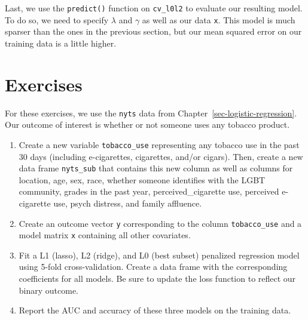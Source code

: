 \documentclass[
  letterpaper,
]{latex/krantz}
\makeatletter
\newenvironment{Shaded}{\begin{snugshade}}{\end{snugshade}}
\newcommand{\AttributeTok}[1]{\textcolor[rgb]{0.40,0.45,0.13}{#1}}
\newcommand{\CommentTok}[1]{\textcolor[rgb]{0.37,0.37,0.37}{#1}}
\newcommand{\DecValTok}[1]{\textcolor[rgb]{0.68,0.00,0.00}{#1}}
\newcommand{\FunctionTok}[1]{\textcolor[rgb]{0.28,0.35,0.67}{#1}}
\newcommand{\NormalTok}[1]{\textcolor[rgb]{0.00,0.23,0.31}{#1}}
\newcommand{\OtherTok}[1]{\textcolor[rgb]{0.00,0.23,0.31}{#1}}
\newcommand{\SpecialCharTok}[1]{\textcolor[rgb]{0.37,0.37,0.37}{#1}}
\newenvironment{kframe}{%
\medskip{}
\setlength{\fboxsep}{.8em}
 \def\at@end@of@kframe{}%
 \ifinner\ifhmode%
  \def\at@end@of@kframe{\end{minipage}}%
  \begin{minipage}{\columnwidth}%
 \fi\fi%
 \def\FrameCommand##1{\hskip\@totalleftmargin \hskip-\fboxsep
 \colorbox{shadecolor}{##1}\hskip-\fboxsep
     \hskip-\linewidth \hskip-\@totalleftmargin \hskip\columnwidth}%
 \MakeFramed {\advance\hsize-\width
   \@totalleftmargin\z@ \linewidth\hsize
   \@setminipage}}%
 {\par\unskip\endMakeFramed%
 \at@end@of@kframe}
\renewenvironment{Shaded}{\begin{kframe}}{\end{kframe}}
\makeatother
\begin{document}
Last, we use the
\texttt{predict()}
function on \texttt{cv\_l0l2} to evaluate our resulting model. To do so,
we need to specify \(\lambda\) and \(\gamma\) as well as our data
\texttt{x}. This model is much sparser than the ones in the previous
section, but our mean squared error on our training data is a little
higher.

\begin{Shaded}
\end{Shaded}

\section{Exercises}\label{exercises-10}

For these exercises, we use the \texttt{nyts} data from
Chapter~\ref{sec-logistic-regression}. Our outcome of interest is
whether or not someone uses any tobacco product.

\begin{enumerate}
\def\labelenumi{\arabic{enumi}.}
\item
  Create a new variable \texttt{tobacco\_use} representing any tobacco
  use in the past 30 days (including e-cigarettes, cigarettes, and/or
  cigars). Then, create a new data frame \texttt{nyts\_sub} that
  contains this new column as well as columns for location, age, sex,
  race, whether someone identifies with the LGBT community, grades in
  the past year, perceived\_cigarette use, perceived e-cigarette use,
  psych distress, and family affluence.
\item
  Create an outcome vector \texttt{y} corresponding to the column
  \texttt{tobacco\_use} and a model matrix \texttt{x} containing all
  other covariates.
\item
  Fit a L1 (lasso), L2 (ridge), and L0 (best subset) penalized
  regression model using 5-fold cross-validation. Create a data frame
  with the corresponding coefficients for all models. Be sure to update
  the loss function to reflect our binary outcome.
\item
  Report the AUC and accuracy of these three models on the training
  data.
\end{enumerate}
\end{document}
